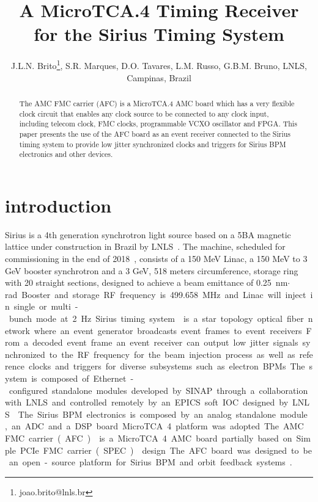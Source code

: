 \documentclass[a4paper,
               biblatex,      %
               ]{jacow}
\begin{document}
\title{A MicroTCA.4  Timing Receiver for the Sirius Timing System}

\author{J.L.N. Brito\thanks{joao.brito@lnls.br}, S.R. Marques, D.O. Tavares, L.M. Russo, G.B.M. Bruno, LNLS, Campinas, Brazil}
	
\maketitle

%
\begin{abstract}
   The AMC FMC carrier (AFC) is a MicroTCA.4 AMC board which has a very flexible clock circuit that enables any clock source to be connected to any clock input, including telecom clock, FMC clocks, programmable VCXO oscillator and FPGA. This paper presents the use of the AFC board as an event receiver connected to the Sirius timing system to provide low jitter synchronized clocks and triggers for Sirius BPM electronics and other devices.
\end{abstract}


\section{introduction}
Sirius is a 4th  generation  synchrotron light source  based  on  a 5BA magnetic lattice under construction in Brazil by LNLS~\cite{sirius_ipac16}. The machine, scheduled for commissioning in the end of 2018~\cite{rodrigues2016sirius}, consists of a 150 MeV Linac, a 150 MeV to 3 GeV booster synchrotron and a 3 GeV, 518 meters circumference, storage ring with 20 straight sections, designed to achieve a beam emittance of \SI{0.25}{nm$\cdot$rad}. Booster and storage RF frequency is \SI{499.658}{MHz} and Linac will inject in single or multi-bunch mode at \SI{2}{Hz}.

Sirius timing system~\cite{timing_icalepcs15} is a star topology optical fiber network where an event generator broadcasts event frames to event receivers. From a decoded event frame an event receiver can output low jitter signals synchronized to the RF frequency for the beam injection process as well as reference clocks and triggers for diverse subsystems such as electron BPMs. The system is composed of Ethernet-configured standalone modules developed by SINAP through a collaboration with LNLS and controlled remotely by an EPICS soft IOC designed by LNLS~\cite{sinap-timing-epics-ioc}.

The Sirius BPM electronics is composed by an analog standalone module, an ADC and a DSP board ... MicroTCA.4 platform was adopted ... The AMC FMC carrier (AFC)~\cite{afc-git} is a MicroTCA.4 AMC board partially based on Simple PCIe FMC carrier (SPEC)~\cite{spec} design. 
The AFC board was designed to be an open-source platform for Sirius BPM and orbit feedback systems~\cite{ebpm_icalepcs13}.
\end{document}
